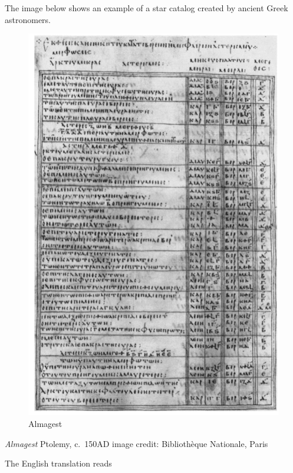 \documentclass[
  letterpaper,
  DIV=11,
  numbers=noendperiod]{scrreprt}
\begin{document}
The image below shows an example of a star catalog created by ancient
Greek astronomers.

\begin{figure}

{\centering \includegraphics{img/Almagest.png}

}

\caption{Almagest}

\end{figure}

\emph{Almagest} Ptolemy, c.~150AD image credit: Bibliothèque Nationale,
Paris

The English translation reads
\end{document}
